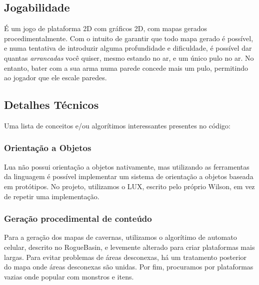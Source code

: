   \subsection{Jogabilidade}
    É um jogo de plataforma 2D com gráficos 2D, com mapas gerados procedimentalmente. Com o intuito de garantir
    que todo mapa gerado é possível, e numa tentativa de introduzir alguma profundidade e dificuldade, é
    possível dar quantas \textit{arrancadas} você quiser, mesmo estando no ar, e um único pulo no ar. No
    entanto, bater com a sua arma numa parede concede mais um pulo, permitindo ao jogador que ele escale
    paredes.
    
  \subsection{Detalhes Técnicos}
    Uma lista de conceitos e/ou algorítimos interessantes presentes no código:
    
    \subsubsection{Orientação a Objetos}
      Lua não possui orientação a objetos nativamente, mas utilizando as ferramentas da linguagem é possível
      implementar um sistema de orientação a objetos baseada em protótipos.
      No projeto, utilizamos o LUX\footnotemark{}, escrito pelo próprio Wilson, em vez de repetir uma implementação.
      
    
    \subsubsection{Geração procedimental de conteúdo}
      Para a geração dos mapas de cavernas, utilizamos o algorítimo de automato celular, descrito no RogueBasin,
      \cite{roguebasin:cellularautomata} e levemente alterado para criar plataformas mais largas. Para
      evitar problemas de áreas desconexas, há um tratamento posterior do mapa onde áreas desconexas são unidas.
      Por fim, procuramos por plataformas vazias onde popular com monstros e itens.